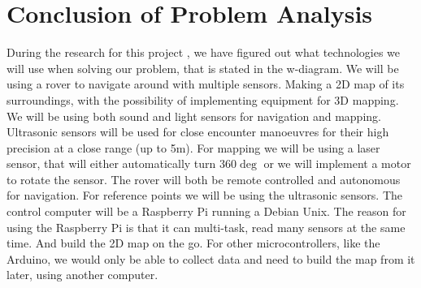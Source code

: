 \section{Conclusion of Problem Analysis}

During the research for this project , we have figured out what technologies we will use when solving our problem, that is stated in the w-diagram.
We will be using a rover to navigate around with multiple sensors. Making a 2D map of its surroundings, with the possibility of implementing equipment for 3D mapping. We will be using both sound and light sensors for navigation and mapping. Ultrasonic sensors will be used for close encounter manoeuvres for their high precision at a close range (up to 5m). For mapping we will be using a laser sensor, that will either automatically turn 360$\deg$ or we will implement a motor to rotate the sensor.
The rover will both be remote controlled and autonomous for navigation. For reference points we will be using the ultrasonic sensors. The control computer will be a Raspberry Pi running a Debian Unix. The reason for using the Raspberry Pi is that it can multi-task, read many sensors at the same time. And build the 2D map on the go. For other microcontrollers, like the Arduino, we would only be able to collect data and need to build the map from it later, using another computer.  



\clearpage
